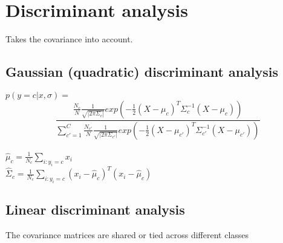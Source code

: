 \section{Discriminant analysis}
Takes the covariance into account.
\subsection{Gaussian (quadratic) discriminant analysis}
$p(y=c|x,\sigma)=$\\
\[
	\frac{\frac{N_c}{N}\frac{1}{\sqrt{|2\pi\Sigma_{c}|}}exp(-\frac{1}{2}(X-\mu_{c})^{T}\Sigma_{c}^{-1}(X-\mu_{c}))}{\sum_{c'=1}^{C}\frac{N_{c'}}{N}\frac{1}{\sqrt{|2\pi\Sigma_{c'}|}}exp(-\frac{1}{2}(X-\mu_{c'})^{T}\Sigma_{c'}^{-1}(X-\mu_{c'}))}
\]\\ $\hat{\mu}_{c}=\frac{1}{N_{c}}\sum_{i:y_i=c}x_{i}$\\
$\hat{\Sigma}_{c}=\frac{1}{N_{c}}\sum_{i:y_i=c}(x_{i}- \hat{\mu}_{c})^{T}(x_{i}-
\hat{\mu}_{c})$\\
\subsection{Linear discriminant analysis}
The covariance matrices are shared or tied across different classes